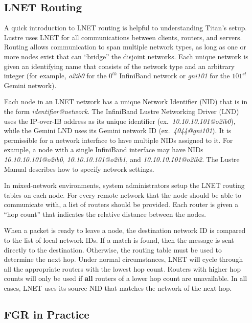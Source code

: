 \subsection{LNET Routing}

A quick introduction to LNET routing is helpful to understanding Titan's setup.
Lustre uses LNET for all communications between clients, routers, and servers.
Routing allows communication to span multiple network types, as long as one or
more nodes exist that can ``bridge'' the disjoint networks.  Each unique
network is given an identifying name that consists of the network type and an
arbitrary integer (for example, \textit{o2ib0} for the $0^{th}$ InfiniBand
network or \textit{gni101} for the $101^{st}$ Gemini network).

Each node in an LNET network has a unique Network Identifier (NID) that is in
the form \textit{identifier@network}.  The InfiniBand Lustre Networking Driver
(LND) uses the IP-over-IB address as its unique identifier
(ex.~\textit{10.10.10.101@o2ib0}), while the Gemini LND uses its Gemini
network ID (ex.~\textit{4044@gni101}).  It is permissible for a network
interface to have multiple NIDs assigned to it.  For example, a node with a
single InfiniBand interface may have NIDs \textit{10.10.10.101@o2ib0},
\textit{10.10.10.101@o2ib1}, and \textit{10.10.10.101@o2ib2}.  The Lustre
Manual \cite{lustre-manual} describes how to specify network settings.

In mixed-network environments, system administrators setup the LNET routing
tables on each node.  For every remote network that the node should be able to
communicate with, a list of routers should be provided.  Each router is given a
``hop count'' that indicates the relative distance between the nodes.

When a packet is ready to leave a node, the destination network ID is compared
to the list of local network IDs.  If a match is found, then the message is
sent directly to the destination.  Otherwise, the routing table must be used to
determine the next hop.  Under normal circumstances, LNET will cycle through
all the appropriate routers with the lowest hop count.  Routers with higher hop
counts will only be used if \textbf{all} routers of a lower hop count are
unavailable.  In all cases, LNET uses its source NID that matches the network
of the next hop.

\subsection{FGR in Practice}

